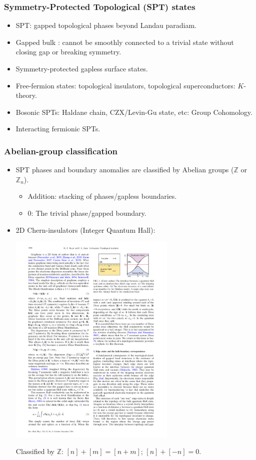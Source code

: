 \documentclass[xcolor=table, 10pt, aspectratio=43]{beamer}
\begin{document}
\begin{frame}
  \frametitle{Symmetry-Protected Topological (SPT) states}
\begin{itemize}
\item SPT: gapped topological phases beyond Landau paradiam.
\item Gapped bulk : cannot be smoothly connected to a trivial state without closing gap or breaking symmetry.
\item Symmetry-protected gapless surface states.
\item Free-fermion states: topological insulators, topological superconductors: $K$-theory.
\item Bosonic SPTs: Haldane chain, CZX/Levin-Gu state, etc: Group Cohomology.
\item Interacting fermionic SPTs.
\end{itemize}
\end{frame}

\begin{frame}
	\frametitle{Abelian-group classification}
	\begin{itemize}
		\item SPT phases and boundary anomalies are classified by Abelian groups ($\mathbb Z$ or $\mathbb Z_n$).
		\begin{itemize}
			\item Addition: stacking of phases/gapless boundaries.
			\item 0: The trivial phase/gapped boundary.
		\end{itemize}
		\item 2D Chern-insulators (Integer Quantum Hall):
		\begin{center}
				\includegraphics[width=8cm]{qhe_edge}
		\end{center}
		Classified by $\mathbb Z$: $[n]+[m]=[n+m]$; $[n]+[-n] = 0$.
	\end{itemize}
\end{frame}
\end{document}
